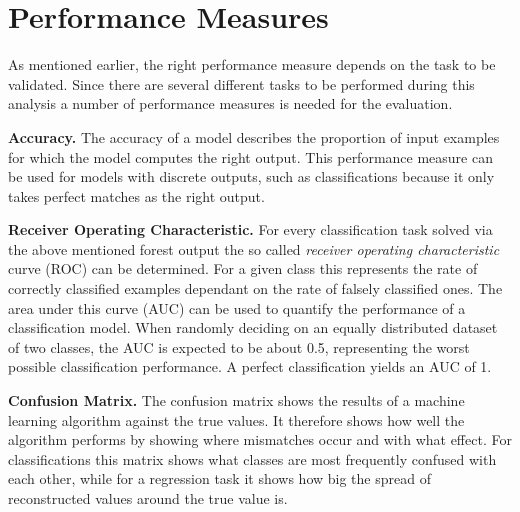 \section{Performance Measures}
%
As mentioned earlier, the right performance measure depends on the task to be
validated. Since there are several different tasks to be performed during this
analysis a number of performance measures is needed for the evaluation.

\textbf{Accuracy.} The accuracy of a model describes the proportion of input
examples for which the model computes the right output. This performance
measure can be used for models with discrete outputs, such as classifications
because it only takes perfect matches as the right output.

\textbf{Receiver Operating Characteristic.} For every classification task solved via the above mentioned forest output the
so called \textit{receiver operating characteristic} curve (ROC) can be
determined. For a given class this represents the rate of correctly classified
examples dependant on the rate of falsely classified ones. The area under this
curve (AUC) can be used to quantify the performance of a classification model.
When randomly deciding on an equally distributed dataset of two classes, the
AUC is expected to be about \num{0.5}, representing the worst possible
classification performance. A perfect classification yields an AUC of \num{1}.

\textbf{Confusion Matrix.} The confusion matrix shows the results of a machine
learning algorithm against the true values. It therefore shows how well the
algorithm performs by showing where mismatches occur and with what effect. For
classifications this matrix shows what classes are most frequently confused
with each other, while for a regression task it shows how big the spread of
reconstructed values around the true value is.

